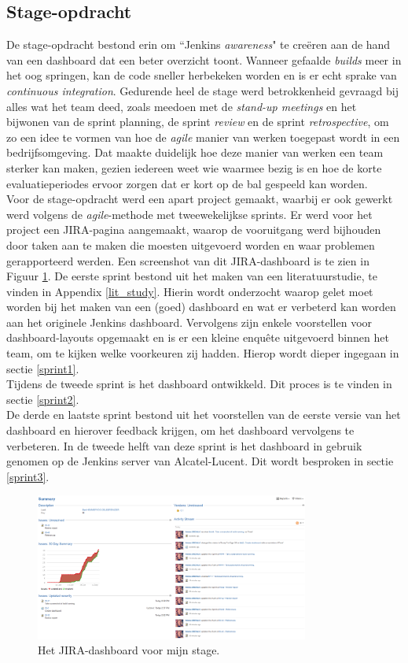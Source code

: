 \documentclass[10pt,a4paper]{article}
\begin{document}
\subsection{Stage-opdracht}
\label{opdracht}
De stage-opdracht bestond erin om ``Jenkins \textit{awareness}" te cre\"eren aan de hand van een dashboard dat een beter overzicht toont.
Wanneer gefaalde \textit{builds} meer in het oog springen, kan de code sneller herbekeken worden en is er echt sprake van \textit{continuous integration}.  Gedurende heel de stage werd betrokkenheid gevraagd bij alles wat het team deed, zoals meedoen met de \textit{stand-up meetings} en het bijwonen van de sprint planning, de sprint \textit{review} en de sprint \textit{retrospective}, om zo een idee te vormen van hoe de \textit{agile} manier van werken toegepast wordt in een bedrijfsomgeving. Dat maakte duidelijk hoe deze manier van werken een team sterker kan maken, gezien iedereen weet wie waarmee bezig is en hoe de korte evaluatieperiodes ervoor zorgen dat er kort op de bal gespeeld kan worden.\\
Voor de stage-opdracht werd een apart project gemaakt, waarbij er ook gewerkt werd volgens de \textit{agile}-methode met tweewekelijkse sprints. Er werd voor het project een JIRA-pagina aangemaakt, waarop de vooruitgang werd bijhouden door taken aan te maken die  moesten uitgevoerd worden en waar problemen gerapporteerd werden. Een screenshot van dit JIRA-dashboard is te zien in Figuur \ref{my_jira}.
De eerste sprint bestond uit het maken van een literatuurstudie, te vinden in Appendix \ref{lit_study}. Hierin wordt onderzocht waarop gelet moet worden bij het maken van een (goed) dashboard en wat er verbeterd kan worden aan het originele Jenkins dashboard. Vervolgens zijn enkele voorstellen voor dashboard-layouts opgemaakt en is er een kleine enqu\^ete uitgevoerd binnen het team, om te kijken welke voorkeuren zij hadden. Hierop wordt dieper ingegaan in sectie \ref{sprint1}.\\
Tijdens de tweede sprint is het dashboard ontwikkeld. Dit proces is te vinden in sectie \ref{sprint2}.\\
De derde en laatste sprint bestond uit het voorstellen van de eerste versie van het dashboard en hierover feedback krijgen, om het dashboard vervolgens te verbeteren. In de tweede helft van deze sprint is het dashboard in gebruik genomen op de Jenkins server van Alcatel-Lucent. Dit wordt besproken in sectie \ref{sprint3}.

\begin{figure}[ht!]
\centering
\includegraphics[width=90mm]{myJIRAscreenshot.png}
\caption{Het JIRA-dashboard voor mijn stage.} 
\label{my_jira}
\end{figure}
\end{document}
